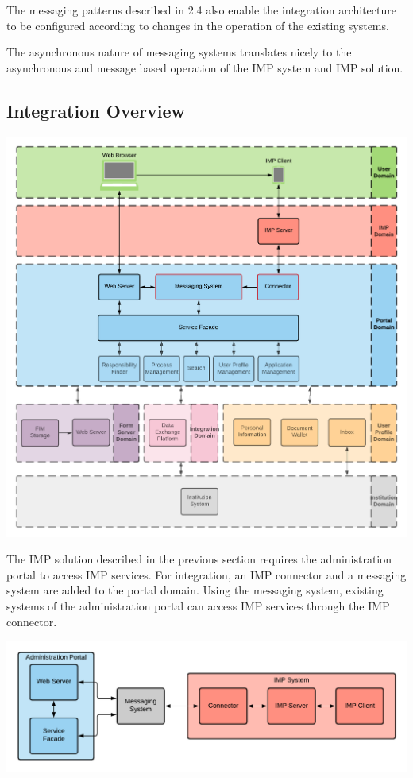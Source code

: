 The messaging patterns described in 2.4 also enable the integration architecture to be configured according to changes in the operation of the existing systems.

The asynchronous nature of messaging systems translates nicely to the asynchronous and message based operation of the IMP system and IMP solution.

\subsection{Integration Overview}

\begin{center}
    \includegraphics[scale=0.6]{Diagrams/Integration Architecture 1/Technological Integration/1. Integration Overview.pdf}
\end{center}

The IMP solution described in the previous section requires the administration portal to access IMP services. For integration, an IMP connector and a messaging system are added to the portal domain. Using the messaging system, existing systems of the administration portal can access IMP services through the IMP connector.

\begin{center}
    \includegraphics[scale=0.6]{Diagrams/Integration Architecture 1/Technological Integration/2. System Integration Overview.pdf}
\end{center}

